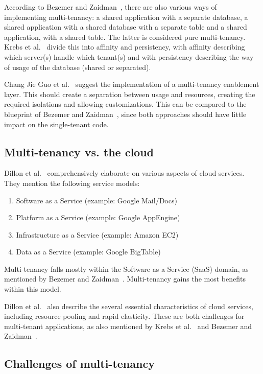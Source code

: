 According to Bezemer and Zaidman~\cite{bezemer2010multi}, there are also various ways of implementing multi-tenancy: a shared application with a separate database, a shared application with a shared database with a separate table and a shared application, with a shared table. The latter is considered pure multi-tenancy. Krebs et al.~\cite{krebs2012architecture} divide this into affinity and persistency, with affinity describing which server(s) handle which tenant(s) and with persistency describing the way of usage of the database (shared or separated).

Chang Jie Guo et al.~\cite{guo2007framework} suggest the implementation of a multi-tenancy enablement layer. This should create a separation between usage and resources, creating the required isolations and allowing customizations. This can be compared to the blueprint of Bezemer and Zaidman~\cite{bezemer2010multi}, since both approaches should have little impact on the single-tenant code.

\subsection{Multi-tenancy vs. the cloud}

Dillon et al.~\cite{dillon2010cloud} comprehensively elaborate on various aspects of cloud services. They mention the following service models: 
\begin{enumerate}
\item Software as a Service (example: Google Mail/Docs)
\item Platform as a Service (example: Google AppEngine)
\item Infrastructure as a Service (example: Amazon EC2)
\item Data as a Service (example: Google BigTable)
\end{enumerate}

Multi-tenancy falls mostly within the Software as a Service (SaaS) domain, as mentioned by Bezemer and Zaidman~\cite{bezemer2010multi}. Multi-tenancy gains the most benefits within this model.

Dillon et al.~\cite{dillon2010cloud} also describe the several essential characteristics of cloud services, including resource pooling and rapid elasticity. These are both challenges for multi-tenant applications, as also mentioned by Krebs et al.~\cite{krebs2012architecture} and Bezemer and Zaidman~\cite{bezemer2010multi}.

\subsection{Challenges of multi-tenancy}

